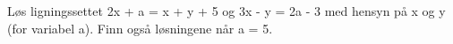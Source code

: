 %
%
Løs ligningssettet 2x + a = x + y + 5  og  3x - y = 2a - 3  med hensyn på x og y (for variabel a).
Finn også løsningene når a = 5.
